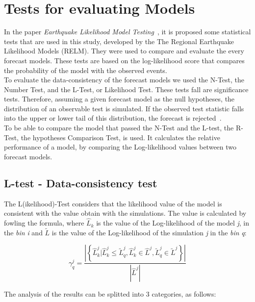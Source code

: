 \section{Tests for evaluating Models}\label{Tests}
In the paper {\it Earthquake Likelihood Model Testing}~\cite{schorlemmer2007earthquake}, it is proposed some statistical tests that are used in this study, developed by the The
Regional Earthquake Likelihood Models (RELM). They were used to compare
and evaluate the every forecast models. These tests are based on the
log-likelihood score that compares the probability of the model with
the observed events.\\

To evaluate the data-consistency of the forecast models we used the
N-Test, the Number Test, and the L-Test, or Likelihood Test. These
tests fall are significance tests. Therefore, assuming a given forecast
model as the null hypotheses, the distribution of an observable test
is simulated. If the observed test statistic falls into the upper or
lower tail of this distribution, the forecast is
rejected~\cite{schorlemmer2010first}.\\

To be able to compare the model that passed the N-Test and the L-test,
the R-Test, the hypotheses Comparison Test, is used. It calculates the
relative performance of a model, by comparing the Log-likelihood
values between two forecast models.\\
\subsection{L-test - Data-consistency test}\label{Ltest}
The L(ikelihood)-Test considers that the likelihood value of the model
is consistent with the value obtain with the simulations. The value is
calculated by fowling the formula, where $\widehat{L}_k$ is the value of the
Log-likelihood of the model {\it j}, in the {\it bin} {\it i} and
$\widetilde{L}$ is the value of the Log-likelihood of the simulation
{\it j} in the {\it bin} {\it q}:


\begin{equation}
\gamma^{j}_{q} = \frac{\left| \left\{ \widehat{L}^j_k | \widehat{L}^j_k \leq \widetilde{L}^j_q, \widehat{L}^j_k \in \widehat{L}^j, \widetilde{L}^j_q \in \widetilde{L}^j  \right\} \right|}  {|\widehat{L}^j|}
\end{equation}

The analysis of the results can be splitted into 3 categories, as follows:

